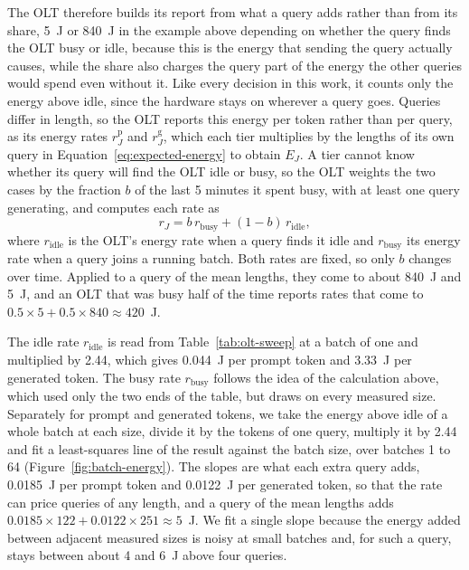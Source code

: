 \documentclass[cic,dipl,english]{infufrgs}
\begin{document}
The OLT therefore builds its report from what a query adds rather than from its share, 5~J or
840~J in the example above depending on whether the query finds the OLT busy or idle, because
this is the energy that sending the query actually causes, while the share also charges the query part of the energy the other queries
would spend even without it. Like every decision in this work, it counts only the energy
above idle, since the hardware stays on wherever a query goes. Queries differ in length, so
the OLT reports this energy per token rather than per query, as its energy rates
$r^{\text{p}}_J$ and $r^{\text{g}}_J$, which each tier multiplies by the lengths of its own
query in Equation~\eqref{eq:expected-energy} to obtain $E_J$. A tier cannot know whether its
query will find the OLT idle or busy, so the OLT weights the two cases by the fraction $b$ of
the last 5 minutes it spent busy, with at least one query generating, and computes each rate as
\begin{equation}
  r_J = b \, r_{\text{busy}} + (1-b) \, r_{\text{idle}},
  \label{eq:olt-report}
\end{equation}
where $r_{\text{idle}}$ is the OLT's energy rate when a query finds it idle and
$r_{\text{busy}}$ its energy rate when a query joins a running batch. Both rates are fixed, so only $b$ changes over
time. Applied to a query of the mean lengths, they come to about 840~J and 5~J, and an OLT that
was busy half of the time reports rates that come to $0.5 \times 5 + 0.5 \times 840 \approx
420$~J.

The idle rate $r_{\text{idle}}$ is read from Table~\ref{tab:olt-sweep} at a batch of one and
multiplied by 2.44, which gives 0.044~J per prompt token and 3.33~J per generated token.
The busy rate $r_{\text{busy}}$ follows the idea of the calculation above, which used only the two ends of the table,
but draws on every measured size. Separately for prompt and generated tokens, we take the energy
above idle of a whole batch at each size, divide it by the tokens of one query, multiply it by
2.44 and fit a least-squares line of the result against the batch size, over batches 1 to 64
(Figure~\ref{fig:batch-energy}). The slopes are what each extra query adds, 0.0185~J per prompt
token and 0.0122~J per generated token, so that the rate can price queries of any length, and
a query of the mean lengths adds $0.0185 \times 122 + 0.0122 \times 251 \approx 5$~J. We fit a single slope because the energy added between adjacent measured sizes is noisy
at small batches and, for such a query, stays between about 4 and 6~J above four queries.
\end{document}
